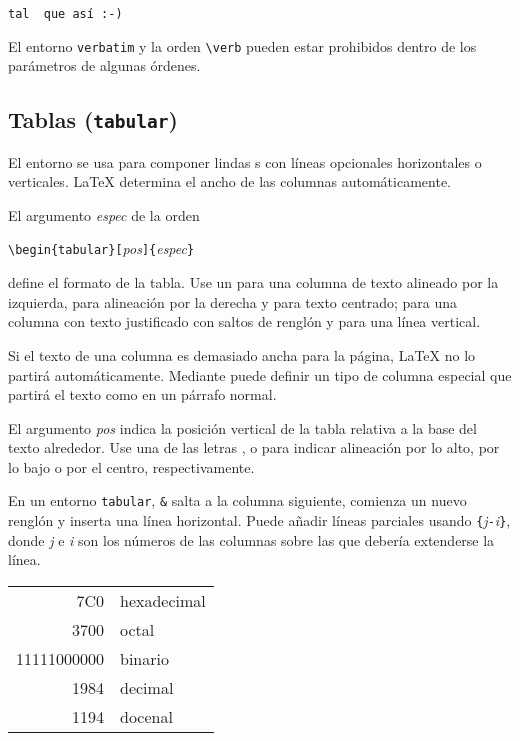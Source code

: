 \begin{example}
\verb*|tal  que así :-) |
\end{example}

El entorno \texttt{verbatim} y la orden \verb|\verb| pueden estar prohibidos dentro de los parámetros de algunas órdenes.

 
\subsection{Tablas (\texttt{tabular})}

\newcommand{\mfr}[1]{\framebox{\rule{0pt}{0.7em}\texttt{#1}}}

El entorno  se usa para componer lindas s con líneas opcionales horizontales o verticales.  \LaTeX{} determina el ancho de las columnas automáticamente.

El argumento \emph{espec} de la orden
\begin{lscommand}
\verb|\begin{tabular}[|\emph{pos}\verb|]{|\emph{espec}\verb|}|
\end{lscommand} 
define el formato de la tabla.  Use un \mfr{l} para una columna de texto alineado por la izquierda, \mfr{r} para alineación por la derecha y \mfr{c} para texto centrado; \mfr{p\{\emph{anchura}\}} para una columna con texto justificado con saltos de renglón y \mfr{|} para una línea vertical.

Si el texto de una columna es demasiado ancha para la página, \LaTeX{} no lo partirá automáticamente.  Mediante \mfr{p\{\emph{anchura}\}} puede definir un tipo de columna especial que partirá el texto como en un párrafo normal.

El argumento \emph{pos} indica la posición vertical de la tabla relativa a la base del texto alrededor.  Use una de las letras \mfr{t}, \mfr{b} o \mfr{c} para indicar alineación por lo alto, por lo bajo o por el centro, respectivamente.
 
En un entorno \texttt{tabular}, \texttt{\&} salta a la columna siguiente, \ci{\bs} comienza un nuevo renglón y  inserta una línea horizontal.  Puede añadir líneas parciales usando \texttt{\{}\emph{j}\texttt{-}\emph{i}\texttt{\}}, donde \emph{j} e \emph{i} son los números de las columnas sobre las que debería extenderse la línea.


\begin{example}
\begin{tabular}{|r|l|}
\hline
7C0 & hexadecimal \\
3700 & octal \\ \cline{2-2}
11111000000 & binario \\
\hline \hline
1984 & decimal \\
1194 & docenal \\
\hline
\end{tabular}
\end{example}


